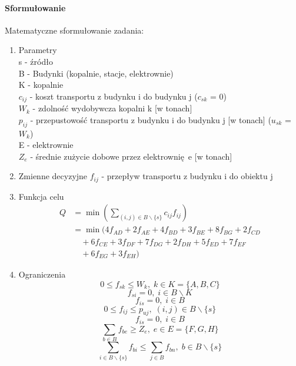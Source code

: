 \documentclass[12pt]{article}
\begin{document}
\paragraph{Sformułowanie}
Matematyczne sformułowanie zadania:
\begin{enumerate}
\item Parametry \\
s - źródło \\
B - Budynki (kopalnie, stacje, elektrownie) \\
K - kopalnie \\
$c_{ij}$ - koszt transportu z budynku i do budynku j ($c_{sk}$ = 0) \\ 
$W_k$ - zdolność wydobywcza kopalni k [w tonach] \\ 
$p_{ij}$ - przepustowość transportu z budynku i do budynku j [w tonach] ($u_{sk}$ = $W_k$) \\ 
E - elektrownie \\ 
$Z_e$ - średnie zużycie dobowe przez elektrownię e [w tonach] \\  
\item Zmienne decyzyjne
$f_{ij}$ - przepływ transportu z budynku i do obiektu j \\ 
\item Funkcja celu
\begin{align*}
    Q &= \min\left(\sum_{(i, j) \in B \backslash \{s\}} c_{ij} f_{ij}\right) \\
    &= \min(4f_{AD} + 2f_{AE} + 4f_{BD} + 3f_{BE} + 8f_{BG} + 2f_{CD} \\
    &\quad + 6f_{CE} + 3f_{DF} + 7f_{DG} + 2f_{DH} + 5f_{ED} + 7f_{EF} \\
    &\quad + 6f_{EG} + 3f_{EH})
\end{align*}

\item Ograniczenia
\begin{equation}
    0 \leq f_{sk} \leq W_k, \; k \in K = \{A, B, C\}
\end{equation}
\begin{equation}
    f_{si} = 0, \; i \in B \backslash K
\end{equation}
\begin{equation}
    f_{is} = 0, \; i \in B
\end{equation}
\begin{equation}
    0 \leq f_{ij} \leq p_{uj}, \; (i, j) \in B \backslash \{s\}
\end{equation}
\begin{equation}
    f_{is} = 0, \; i \in B
\end{equation}
\begin{equation}
    \sum_{b \in B} f_{be} \ge Z_e, \; e \in E = \{F, G, H\}
\end{equation}
\begin{equation}
    \sum_{i \in B \backslash \{ s \} } f_{bi} \leq \sum_{j \in B} f_{bn}, \; b \in B \backslash \{s\}
\end{equation}

\end{enumerate}
\end{document}
